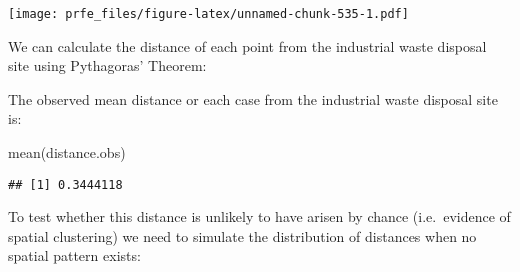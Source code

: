 \documentclass[
  12pt,
  a4paper]{book}
\newenvironment{Shaded}{\begin{snugshade}}{\end{snugshade}}
\newcommand{\AttributeTok}[1]{\textcolor[rgb]{0.77,0.63,0.00}{#1}}
\newcommand{\DecValTok}[1]{\textcolor[rgb]{0.00,0.00,0.81}{#1}}
\newcommand{\FloatTok}[1]{\textcolor[rgb]{0.00,0.00,0.81}{#1}}
\newcommand{\FunctionTok}[1]{\textcolor[rgb]{0.00,0.00,0.00}{#1}}
\newcommand{\NormalTok}[1]{#1}
\newcommand{\OtherTok}[1]{\textcolor[rgb]{0.56,0.35,0.01}{#1}}
\newcommand{\SpecialCharTok}[1]{\textcolor[rgb]{0.00,0.00,0.00}{#1}}
\begin{document}
\begin{Shaded}
\end{Shaded}

\texttt{[image: prfe\_files/figure-latex/unnamed-chunk-535-1.pdf]}

We can calculate the distance of each point from the industrial waste disposal site using Pythagoras' Theorem:

\begin{Shaded}
\end{Shaded}

The observed mean distance or each case from the industrial waste disposal site is:

\begin{Shaded}
\begin{Highlighting}[]
\FunctionTok{mean}\NormalTok{(distance.obs)}
\end{Highlighting}
\end{Shaded}

\begin{verbatim}
## [1] 0.3444118
\end{verbatim}

To test whether this distance is unlikely to have arisen by chance (i.e.~evidence of spatial clustering) we need to simulate the distribution of distances when no spatial pattern exists:
\end{document}
